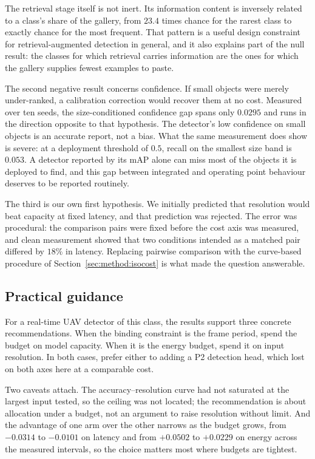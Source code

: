 The retrieval stage itself is not inert. Its information content is inversely related to a
class's share of the gallery, from $23.4$ times chance for the rarest class to exactly
chance for the most frequent. That pattern is a useful design constraint for
retrieval-augmented detection in general, and it also explains part of the null result:
the classes for which retrieval carries information are the ones for which the gallery
supplies fewest examples to paste.

The second negative result concerns confidence. If small objects were merely under-ranked,
a calibration correction would recover them at no cost. Measured over ten seeds, the
size-conditioned confidence gap spans only $0.0295$ and runs in the direction opposite to
that hypothesis. The detector's low confidence on small objects is an accurate report, not a
bias. What the same measurement does show is severe: at a deployment threshold of $0.5$,
recall on the smallest size band is $0.053$. A detector reported by its mAP alone can miss
most of the objects it is deployed to find, and this gap between integrated and operating
point behaviour deserves to be reported routinely.

The third is our own first hypothesis. We initially predicted that resolution would beat
capacity at fixed latency, and that prediction was rejected. The error was procedural: the
comparison pairs were fixed before the cost axis was measured, and clean measurement showed
that two conditions intended as a matched pair differed by $18\%$ in latency. Replacing
pairwise comparison with the curve-based procedure of Section~\ref{sec:method:isocost} is
what made the question answerable.

\subsection{Practical guidance}
\label{sec:discussion:guidance}

For a real-time UAV detector of this class, the results support three concrete
recommendations. When the binding constraint is the frame period, spend the budget on model
capacity. When it is the energy budget, spend it on input resolution. In both cases, prefer
either to adding a P2 detection head, which lost on both axes here at a comparable cost.

Two caveats attach. The accuracy--resolution curve had not saturated at the largest input
tested, so the ceiling was not located; the recommendation is about allocation under a
budget, not an argument to raise resolution without limit. And the advantage of one arm over
the other narrows as the budget grows, from $-0.0314$ to $-0.0101$ on latency and from
$+0.0502$ to $+0.0229$ on energy across the measured intervals, so the choice matters most
where budgets are tightest.

